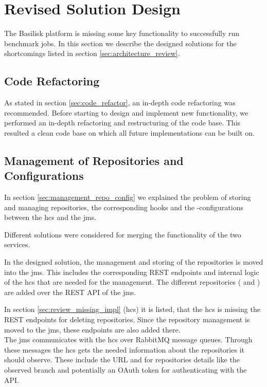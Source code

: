 \section{Revised Solution Design}
\label{sec:revised_solution_design}

The Basilisk platform is missing some key functionality to successfully run benchmark jobs.
In this section we describe the designed solutions for the shortcomings listed in section \ref{sec:architecture_review}.



\subsection{Code Refactoring}
\label{sec:impl_code_refactor}
As stated in section \ref{sec:code_refactor}, an in-depth code refactoring was recommended.
Before starting to design and implement new functionality, we performed an in-depth refactoring and restructuring of the code base.
This resulted a clean code base on which all future implementations can be built on.


\subsection{Management of Repositories and Configurations}
\label{sec:management_repo_config_design}
In section \ref{sec:management_repo_config} we explained the problem of storing and managing repositories, the corresponding hooks and the \ts{}-configurations between the \acf{hcs} and the \acf{jms}.

Different solutions were considered for merging the functionality of the two services.

In the designed solution, the management and storing of the repositories is moved into the \ac{jms}.
This includes the corresponding REST endpoints and internal logic of the \ac{hcs} that are needed for the management.
The different repositories (\gh{} and \dockh{}) are added over the REST API of the \ac{jms}.

In section \ref{sec:review_missing_impl} (\acl{hcs}) it is listed, that the \ac{hcs} is missing the REST endpoints for deleting repositories.
Since the repository management is moved to the \ac{jms}, these endpoints are also added there.
\\

The \ac{jms} communicates with the \ac{hcs} over RabbitMQ message queues.
Through these messages the \ac{hcs} gets the needed information about the repositories it should observe.
These include the URL and for \gh{} repositories details like the observed branch and potentially an OAuth token for authenticating with the API.

